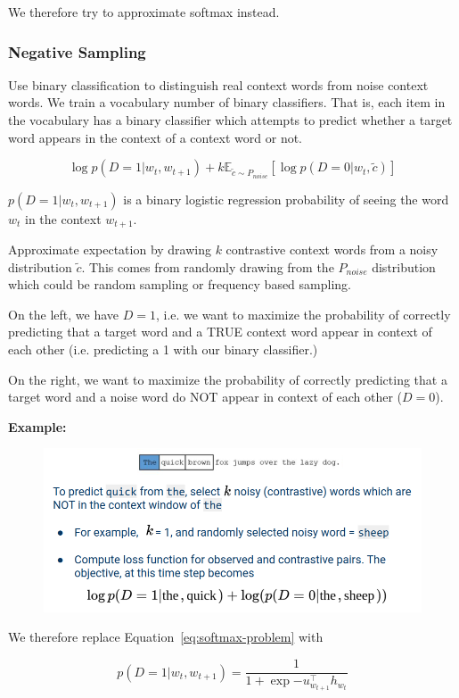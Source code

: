\documentclass[11pt]{article}
\begin{document}
We therefore try to approximate softmax instead.

\subsubsection{Negative Sampling}

Use binary classification to distinguish real context words from noise context words. We train a vocabulary number of binary classifiers. That is, each item in the vocabulary has a binary classifier which attempts to predict whether a target word appears in the context of a context word or not.

\begin{equation*}
    \log p(D=1|w_t , w_{t+1}) + k \mathbb{E}_{\tilde{c}\sim P_{noise}}\left[\log p(D=0|w_t, \tilde{c})\right]
\end{equation*}

$p(D=1|w_t, w_{t+1})$ is a binary logistic regression probability of seeing the word $w_t$ in the context $w_{t+1}$.

Approximate expectation by drawing $k$ contrastive context words from a noisy distribution $\tilde{c}$. This comes from randomly drawing from the $P_{noise}$ distribution which could be random sampling or frequency based sampling.

On the left, we have $D=1$, i.e. we want to maximize the probability of correctly predicting that a target word and a TRUE context word appear in context of each other (i.e. predicting a 1 with our binary classifier.)

On the right, we want to maximize the probability of correctly predicting that a target word and a noise word do NOT appear in context of each other ($D=0$).

\textbf{Example:}

\begin{figure}[H]
    \centering
    \includegraphics*[width=.5\linewidth]{figures/skip-gram-negative-sampling-example.png}
\end{figure}

We therefore replace Equation~\ref{eq:softmax-problem} with

\begin{equation}
    p(D=1|w_t, w_{t+1}) = \frac{1}{1 + \exp{-u_{w_{t+1}}^\top h_{w_t}}}\label{eq:sigmoid}
\end{equation}
\end{document}

